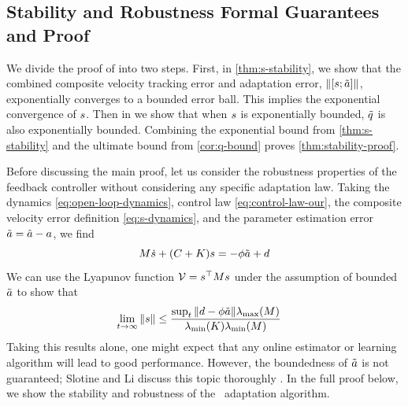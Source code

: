 \subsection{Stability and Robustness Formal Guarantees and Proof}
\label{sec:supp-stability}

We divide the proof of  into two steps. First, in \cref{thm:s-stability}, we show that the combined composite velocity tracking error and adaptation error, $\|[ s;\tilde{ a}]\|$, exponentially converges to a bounded error ball. This implies the exponential convergence of $ s$. Then in  we show that when $ s$ is exponentially bounded, $\tilde{ q}$ is also exponentially bounded. Combining the exponential bound from \cref{thm:s-stability} and the ultimate bound from \cref{cor:q-bound} proves \cref{thm:stability-proof}.

Before discussing the main proof, let us consider the robustness properties of the feedback controller without considering any specific adaptation law. Taking the dynamics \cref{eq:open-loop-dynamics}, control law \cref{eq:control-law-our}, the composite velocity error definition \cref{eq:s-dynamics}, and the parameter estimation error $\tilde{ a}=\hat{ a}- a$, we find
\begin{equation}
    \label{eq:s-closed-loop}
    M\dot{ s}+(C+K) s=-\phi \tilde{ a}+ d
\end{equation}
We can use the Lyapunov function $\mathcal{V}= s^\top M  s$ under the assumption of bounded $\tilde{ a}$ to show that
\begin{align}
  \lim_{t\rightarrow\infty}\left\|  s \right\| &\leq \frac{\sup_t\| d-\phi\tilde{ a}\| \lambda_\text{\normalfont{max}}(M)}{\lambda_\text{\normalfont{min}}(K) \lambda_\text{\normalfont{min}}(M)}
\end{align}
Taking this results alone, one might expect that any online estimator or learning algorithm will lead to good performance. 
However, the boundedness of $\tilde{ a}$ is not guaranteed; Slotine and Li discuss this topic thoroughly \cite{slotine1991applied}. In the full proof below, we show the stability and robustness of the \nf~adaptation algorithm.

